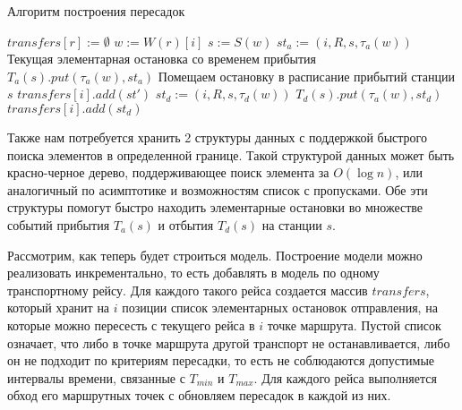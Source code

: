 \begin{algorithm}[!h]
	\caption{Алгоритм построения пересадок}\label{lst4}
	\begin{algorithmic}
		\State $transfers[r] := \emptyset$ 
			\State $w := W(r)[i]$
			\State $s := S(w)$ 
			 
				\State $st_a := (i, R, s, \tau_a(w))$ {Текущая элементарная остановка со временем прибытия}
				\State $T_a(s).put(\tau_a(w), st_a)$ {Помещаем остановку в расписание прибытий станции $s$}
					 
						\State $transfers[i].add(st')$
					\EndIf
				\EndFor
			\EndIf
			 
				\State $st_d := (i, R, s, \tau_d(w))$
				\State $T_d(s).put(\tau_a(w), st_d)$
					 
						\State $transfers[i].add(st_d)$
					\EndIf
				\EndFor
			\EndIf
		\EndFor
		\EndFor
		\EndFunction
	\end{algorithmic}
\end{algorithm}

Также нам потребуется хранить 2 структуры данных с поддержкой быстрого поиска элементов в определенной границе. Такой структурой данных может быть красно-черное дерево, поддерживающее поиск элемента за $O(\log n)$, или аналогичный по асимптотике и возможностям список с пропусками. Обе эти структуры помогут быстро находить элементарные остановки во множестве событий прибытия $T_a(s)$ и отбытия $T_d(s)$ на станции $s$.

Рассмотрим, как теперь будет строиться модель. Построение модели можно реализовать инкрементально, то есть добавлять в модель по одному транспортному рейсу. Для каждого такого рейса создается массив $transfers$, который хранит на $i$ позиции список элементарных остановок отправления, на которые можно пересесть с текущего рейса в $i$ точке маршрута. Пустой список означает, что либо в точке маршрута другой транспорт не останавливается, либо он не подходит по критериям пересадки, то есть не соблюдаются допустимые интервалы времени, связанные с $T_{min}$ и $T_{max}$. Для каждого рейса выполняется обход его маршрутных точек с обновляем пересадок в каждой из них.
\FloatBarrier 

